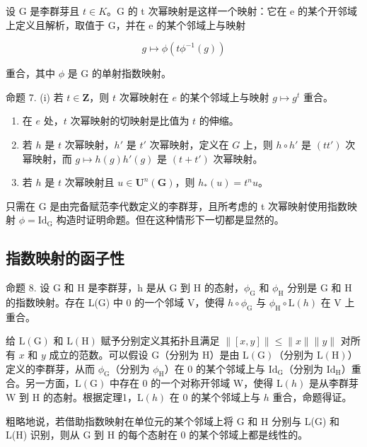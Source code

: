 设 G 是李群芽且 \(t \in K\)。G 的 t 次幂映射是这样一个映射：它在 e 的某个开邻域上定义且解析，取值于 G，并在 e 的某个邻域上与映射

\[
g \mapsto \phi (t \phi^ {- 1} (g))
\]

重合，其中 \(\phi\) 是 G 的单射指数映射。

命题 7. (i) 若 \(t \in \mathbf{Z}\)，则 \(t\) 次幂映射在 \(e\) 的某个邻域上与映射 \(g \mapsto g^t\) 重合。

\begin{enumerate}
\def\labelenumi{(\roman{enumi})}
\setcounter{enumi}{1}
\item
  在 \(e\) 处，\(t\) 次幂映射的切映射是比值为 \(t\) 的伸缩。
\item
  若 \(h\) 是 \(t\) 次幂映射，\(h'\) 是 \(t'\) 次幂映射，定义在 \(G\) 上，则 \(h \circ h'\) 是 \((tt')\) 次幂映射，而 \(g \mapsto h(g)h'(g)\) 是 \((t + t')\) 次幂映射。
\item
  若 \(h\) 是 \(t\) 次幂映射且 \(u \in \mathbf{U}^n(\mathbf{G})\)，则 \(h_*(u) = t^n u\)。
\end{enumerate}

只需在 G 是由完备赋范李代数定义的李群芽，且所考虑的 t 次幂映射使用指数映射 \(\phi = \mathrm{Id}_{\mathrm{G}}\) 构造时证明命题。但在这种情形下一切都是显然的。

\subsection{指数映射的函子性}

命题 8. 设 G 和 H 是李群芽，h 是从 G 到 H 的态射，\(\phi_{\mathrm{G}}\) 和 \(\phi_{\mathrm{H}}\) 分别是 G 和 H 的指数映射。存在 L(G) 中 0 的一个邻域 V，使得 \(h \circ \phi_{\mathrm{G}}\) 与 \(\phi_{\mathrm{H}} \circ \mathrm{L}(h)\) 在 V 上重合。

给 \(\mathrm{L}(\mathrm{G})\) 和 \(\mathrm{L}(\mathrm{H})\) 赋予分别定义其拓扑且满足 \(\| [x,y]\| \leqslant \| x\| \| y\|\) 对所有 \(x\) 和 \(y\) 成立的范数。可以假设 \(\mathrm{G}\)（分别为 H）是由 \(\mathrm{L}(\mathrm{G})\)（分别为 \(\mathrm{L}(\mathrm{H})\)）定义的李群芽，从而 \(\phi_{\mathrm{G}}\)（分别为 \(\phi_{\mathrm{H}}\)）在 0 的某个邻域上与 \(\mathrm{Id}_{\mathrm{G}}\)（分别为 \(\mathrm{Id}_{\mathrm{H}}\)）重合。另一方面，\(\mathrm{L}(\mathrm{G})\) 中存在 0 的一个对称开邻域 W，使得 \(\mathrm{L}(h)\) 是从李群芽 W 到 H 的态射。根据定理1，\(\mathrm{L}(h)\) 在 0 的某个邻域上与 \(h\) 重合，命题得证。

粗略地说，若借助指数映射在单位元的某个邻域上将 G 和 H 分别与 L(G) 和 L(H) 识别，则从 G 到 H 的每个态射在 0 的某个邻域上都是线性的。

